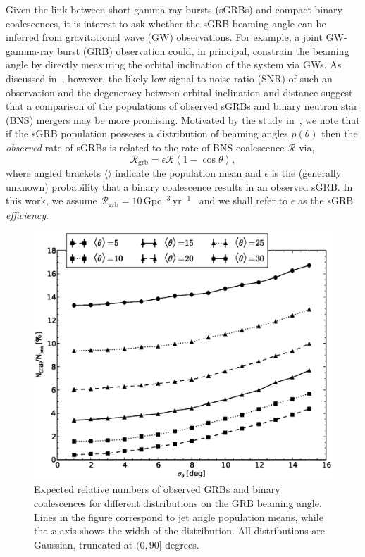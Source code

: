 \documentclass[twocolumn,nofootinbib]{revtex4-1}
\newcommand{\grbrate}{{{\mathcal R}_{\mathrm{grb}}}}
\newcommand{\cbcrate}{{{\mathcal R}}}
\def\bns#1{binary neutron star#1 (BNS#1)\gdef\bns{BNS}}
\def\gw#1{gravitational wave#1 (GW#1)\gdef\gw{GW}}
\def\grb#1{gamma-ray burst#1 (GRB#1)\gdef\grb{GRB}}
\def\sgrb#1{short gamma-ray burst#1 (sGRB#1)\gdef\sgrb{sGRB}}
\def\snr#1{signal-to-noise ratio#1 (SNR#1)\gdef\snr{SNR}}
\begin{document}
Given the link between \sgrb{s} and compact binary coalescences, it is interest
to ask whether the \sgrb{} beaming angle can be inferred from \gw{}
observations.  For example, a joint \gw{}-\grb{} observation could, in
principal, constrain the beaming angle by directly measuring the orbital
inclination of the system via \gw{s}.  As discussed
in~\cite{0004-637X-809-1-53}, however, the likely low \snr{} of such an
observation and the degeneracy between orbital inclination and distance suggest
that a comparison of the populations of observed \sgrb{s} and \bns{} mergers may
be more promising.   Motivated by the study in~\cite{2013PhRvL.111r1101C}, we
note that if the \sgrb{} population posseses a distribution of beaming angles
$p(\theta)$ then the \emph{observed} rate of \sgrb{s} is related to the rate of
\bns{} coalescence $\cbcrate$ via,
%
\begin{equation}\label{eq:rate2angle}
\grbrate=\epsilon\cbcrate \left \langle 1-\cos \theta \right \rangle,
\end{equation}
%
where angled brackets $\langle \rangle$ indicate the population mean and
$\epsilon$ is the (generally unknown) probability that a binary coalescence
results in an observed \sgrb{}.  In this work, we assume
$\grbrate=10$\,Gpc$^{-3}$\,yr$^{-1}$~\cite{nakar-2007,Dietz11} and we shall
refer to $\epsilon$ as the \sgrb{} \emph{efficiency}.
 

\begin{figure}
\centering
\includegraphics[width=\linewidth]{theta_dist_grbfrac.eps}
\caption{\label{fig:thetapopulation} Expected relative
numbers of observed GRBs and binary coalescences for different distributions
on the GRB beaming angle.  Lines in the figure correspond to jet angle
population means, while the $x$-axis shows the width of the distribution.  All 
distributions are Gaussian, truncated at $(0, 90]$ degrees.}
\end{figure}
\end{document}
